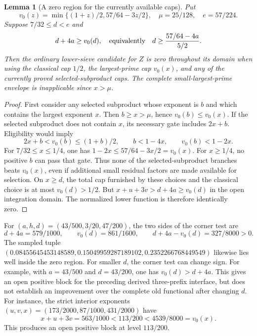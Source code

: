 \documentclass[11pt]{article}
\newtheorem{lemma}[theorem]{Lemma}
\begin{document}
\begin{lemma}[A zero region for the currently available caps]
Put
\[
 v_0(z)=\min\{(1+z)/2,57/64-3z/2\},\quad
 \mu=25/128,\quad e=57/224.
\]
Suppose $7/32\le d<e$ and
\begin{equation}\label{eq:richer-Z-zero}
 d+4a\ge v_0(d),\quad\hbox{equivalently}\quad
 d\ge\frac{57/64-4a}{5/2}.
\end{equation}
Then the ordinary lower-sieve candidate for $Z$ is zero throughout its
domain when using the classical cap $1/2$, the largest-prime cap
$v_0(x)$, and any of the currently proved selected-subproduct caps.
The complete small-largest-prime envelope is inapplicable since $x>\mu$.
\end{lemma}

\begin{proof}
First consider any selected subproduct whose exponent is $b$ and which
contains the largest exponent $x$.  Then $b\ge x>\mu$, hence
$v_0(b)\le v_0(x)$.  If the selected subproduct does not contain $x$,
its necessary gate includes $2x+b$.  Eligibility would imply
\[
 2x+b<v_0(b)\le(1+b)/2,\qquad b<1-4x,
 \qquad v_0(b)<1-2x.
\]
For $7/32\le x\le1/4$, one has
$1-2x\le57/64-3x/2=v_0(x)$.
For $x\ge1/4$, no positive $b$ can pass that gate.
Thus none of the selected-subproduct branches beats $v_0(x)$,
even if additional small residual factors are made available for
selection.  On $x\ge d$, the total cap furnished by these choices
and the classical choice is at most $v_0(d)>1/2$.
But $x+u+3v>d+4a\ge v_0(d)$ in the open integration domain.
The normalized lower function is therefore identically zero.
\end{proof}

For $(a,h,d)=(43/500,3/20,47/200)$, the two sides of the corner test are
\[
 d+4a=579/1000,\qquad v_0(d)=861/1600,
 \qquad d+4a-v_0(d)=327/8000>0.
\]
The sampled tuple $(0.08455645453148589,0.15049959287189102,
0.2352266768449549)$ likewise lies well inside the zero region.
For smaller $d$, the corner test can change sign.  For example, with
$a=43/500$ and $d=43/200$, one has $v_0(d)>d+4a$.
This gives an open positive block for the preceding derived
three-prefix interface, but does not establish an improvement over
the complete old functional after changing $d$.
For instance, the strict interior exponents
$(u,v,x)=(173/2000,87/1000,431/2000)$ have
\[
 x+u+3v=563/1000<113/200<4539/8000=v_0(x).
\]
This produces an open positive block at level $113/200$.
\end{document}
